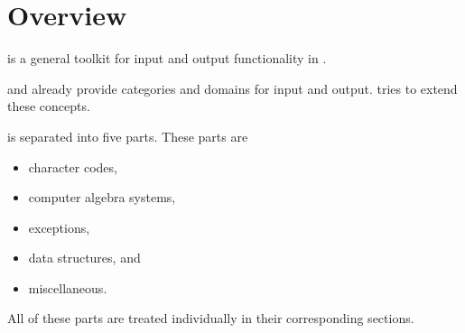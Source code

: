 %                                                                        
%                                                                        
%                                                                        
%                                                                        
%
\pagebreak
\section{Overview}

\projectname is a general toolkit for input and output functionality in \Aldor.

\LibAldor and \LibAlgebra already provide categories and domains for input and output. \projectname tries to extend these concepts.

\projectname is separated into five parts. These parts are

\begin{itemize}
\item character codes,
\item computer algebra systems,
\item exceptions,
\item data structures, and
\item miscellaneous.
\end{itemize}

All of these parts are treated individually in their corresponding sections.




